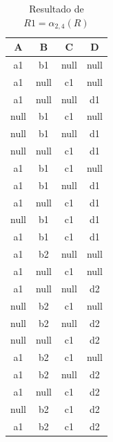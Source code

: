 \begin{enumerate}
\begin{enumerate}
\begin{table}[ht]
\begin{center}
\begin{tabular}{|c|c|c|c|}\hline
\textbf{A}    & \textbf{B}    & \textbf{C}    & \textbf{D}\\ \hline
a1   & b1   & null & null\\ \hline
a1   & null & c1   & null\\ \hline
a1   & null & null & d1\\ \hline
null & b1   & c1   & null\\ \hline
null & b1   & null & d1\\ \hline
null & null & c1   & d1\\ \hline
a1   & b1   & c1   & null\\ \hline
a1   & b1   & null & d1\\ \hline
a1   & null & c1   & d1\\ \hline
null & b1   & c1   & d1\\ \hline
a1   & b1   & c1   & d1\\ \hline
a1   & b2   & null & null\\ \hline
a1   & null & c1   & null\\ \hline
a1   & null & null & d2\\ \hline
null & b2   & c1   & null\\ \hline
null & b2   & null & d2\\ \hline
null & null & c1   & d2\\ \hline
a1   & b2   & c1   & null\\ \hline
a1   & b2   & null & d2\\ \hline
a1   & null & c1   & d2\\ \hline
null & b2   & c1   & d2\\ \hline
a1   & b2   & c1   & d2\\ \hline
\end{tabular}
\end{center}
\caption{Resultado de $R1=\alpha_{2,4}(R)$}
\label{r1}
\end{table}


\end{enumerate}
\end{enumerate}
